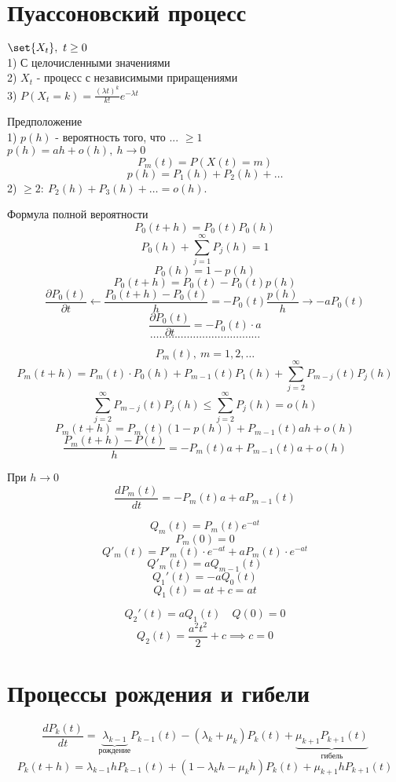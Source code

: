 \documentclass[a4paper]{article}
\DeclarePairedDelimiter\set\{\}
\theoremstyle{definition}
\theoremstyle{remark}
\begin{document}
\section*{\centering Пуассоновский процесс}
$ \set{X_t} , \ t \geq 0 $ \\
1) С целочисленными значениями\\
2) $ X_t $ - процесс с независимыми приращениями\\
3) $ P(X_t = k) = \frac{(\lambda t)^{k}}{k!} e^{-\lambda t} $ 

Предположение\\
1) $p(h)$ - вероятность того, что ... $ \geq 1 $\\
$ p(h) = ah + o(h), \ h \to 0$ 
\[
    P_m(t) = P(X(t) = m)
\]
\[
    p(h) = P_1(h) + P_2(h) + \dots
\]
2) $ \geq 2: \ P_2(h) + P_3(h) + \dots = o(h) $.

Формула полной вероятности
\[
    P_0(t+h) = P_0(t) P_0(h)
\]
\[
    P_0(h) + \sum_{j=1}^{\infty} P_j(h) = 1
\]
\[
    P_0(h) = 1 - p(h)
\]
\[
    P_0(t+h) = P_0(t) - P_0(t) p(h)
\]
\[
    \frac{\partial P_0(t)}{\partial t} \leftarrow \frac{P_0(t+h) - P_0(t)}{h} =
    -P_0(t) \frac{p(h)}{h} \to - a P_0(t)
\]
\[
    \frac{\partial P_0(t)}{\partial t}  = -P_0(t) \cdot a
\]
\[
    \dots\dots\dots\dots\dots\dots \dots\dots\dots\dots\dots\dots
\]

\[
    P_m(t), \ m = 1, 2, \dots
\]
\[
    P_m(t+h) = P_m(t) \cdot P_0(h) + P_{m-1}(t) P_1(h) + 
    \sum_{j=2}^{\infty} P_{m-j}(t) P_j(h)
\]
\[
    \sum_{j=2}^{\infty} P_{m-j}(t) P_j(h)
    \leq \sum_{j=2}^{\infty} P_j(h) = o(h)
\]
\[
    P_m(t+h) = P_m(t) (1- p(h)) + P_{m-1}(t)ah + o(h)
\]
\[
    \frac{P_m(t+h) - P(t)}{h} = -P_m(t)a + P_{m-1}(t) a + o(h)
\]

При $ h \to 0 $ 
\[
    \frac{d P_m(t)}{dt} = -P_m(t)a + aP_{m-1}(t)
\]

\[
    Q_m(t) = P_m(t) e^{-at}
\]
\[
    P_m(0) = 0
\]
\[
    Q'_m(t) = P'_m(t) \cdot e^{-at} + aP_m(t) \cdot e^{-at}
\]
\[
    Q'_m(t) = aQ_{m-1}(t)
\]
\[
    Q_1'(t) = -a Q_0(t)
\]
\[
    Q_1(t) = at + c = at
\]

\[
    Q_2'(t) = a Q_1(t) \quad Q(0) = 0
\]
\[
    Q_2(t) = \frac{a^2 t^2}{2} + c \implies c = 0
\]

\section*{\centering Процессы рождения и гибели}
\[
    \frac{dP_k(t)}{dt} = \underbrace{\lambda_{k-1}}_{\text{рождение}} P_{k-1}(t) - 
    (\lambda_k + \mu_k) P_k(t) + \underbrace{\mu_{k+1}P_{k+1}(t)}_{\text{гибель}}
\]
\[
    P_k(t+h) = \lambda_{k-1} h P_{k-1}(t) + (1 - \lambda_kh - \mu_k h)
    P_k(t) + \mu_{k+1} h P_{k+1}(t)
\]
\end{document}
